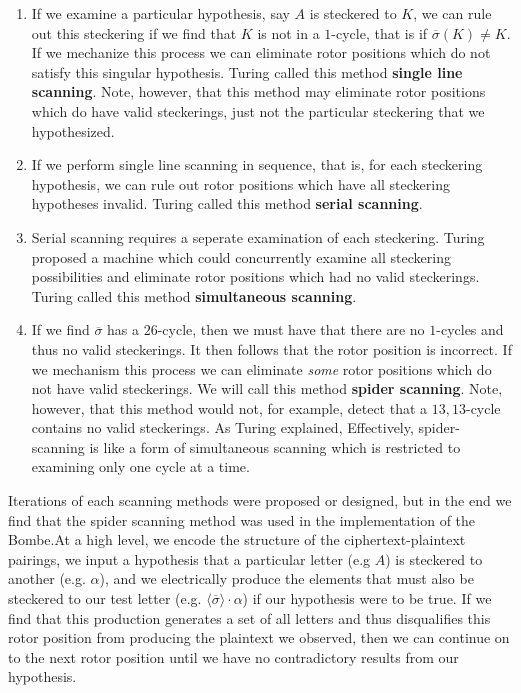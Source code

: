     \begin{enumerate}
        \item If we examine a particular hypothesis, say $A$ is steckered to $K$, we can rule out this steckering if we find that $K$ is not in a $1$-cycle, that is if $\overline\sigma(K) \ne K$. If we
        mechanize this process we can eliminate rotor positions which do not satisfy this singular hypothesis. Turing called this method \textbf{single line scanning}. Note, however, that this method may eliminate rotor
        positions which do have valid steckerings, just not the particular steckering that we hypothesized.
        \item If we perform single line scanning in sequence, that is, for each steckering hypothesis, we can rule out rotor positions which have all steckering hypotheses invalid. Turing called this method \textbf{serial scanning}.
        \item Serial scanning requires a seperate examination of each steckering. Turing proposed a machine which could concurrently examine all steckering possibilities and eliminate rotor positions
        which had no valid steckerings. Turing called this method \textbf{simultaneous scanning}.
        \item If we find $\overline\sigma$ has a $26$-cycle, then we must have that there are no $1$-cycles and thus no valid steckerings. It then follows that the rotor position is incorrect.
        If we mechanism this process we can eliminate \emph{some} rotor positions which do not have valid steckerings. We will call this method \textbf{spider scanning}. Note, however, that this method 
        would not, for example, detect that a $13,13$-cycle contains no valid steckerings. As Turing explained, 
         Effectively, spider-scanning is like a form of simultaneous scanning which is restricted
        to examining only one cycle at a time.
    \end{enumerate}
    Iterations of each scanning methods were proposed or designed, but in the end we find that the spider scanning method was used in the implementation of the Bombe.At a high level, we encode the structure of the ciphertext-plaintext pairings, we input a hypothesis that a particular 
    letter (e.g $A$) is steckered to another (e.g. $\alpha$), and we electrically produce the elements that must also be steckered to our test letter 
    (e.g. $\langle\overline{\sigma}\rangle\cdot\alpha$) if our hypothesis were to be true. If we find that this production generates a set of all letters and thus disqualifies this rotor position from producing
    the plaintext we observed, then we can continue on to the next rotor position until we have no contradictory results from our hypothesis.

